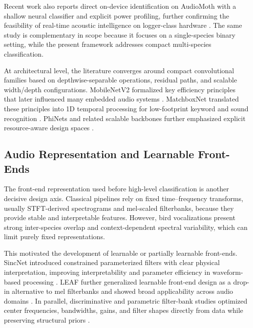 \documentclass[a4paper,singleside,12pt]{report} %
\begin{document}
	Recent work also reports direct on-device identification on AudioMoth with a shallow neural classifier and explicit power profiling, further confirming the feasibility of real-time acoustic intelligence on logger-class hardware \cite{velascomontero2026onsite}. The same study is complementary in scope because it focuses on a single-species binary setting, while the present framework addresses compact multi-species classification.

		\begin{sloppypar}
		At architectural level, the literature converges around compact convolutional families based on depthwise-separable operations, residual paths, and scalable width/depth configurations. MobileNetV2 formalized key efficiency principles that later influenced many embedded audio systems \cite{mobilenetv2}. MatchboxNet translated these principles into 1D temporal processing for low-footprint keyword and sound recognition \cite{matchboxnet2020}. PhiNets and related scalable backbones further emphasized explicit resource-aware design spaces \cite{phinets2022,paissan2022scalableaudio}.
		\end{sloppypar}

	\subsection{Audio Representation and Learnable Front-Ends}
	The front-end representation used before high-level classification is another decisive design axis. Classical pipelines rely on fixed time--frequency transforms, usually STFT-derived spectrograms and mel-scaled filterbanks, because they provide stable and interpretable features. However, bird vocalizations present strong inter-species overlap and context-dependent spectral variability, which can limit purely fixed representations.

		\begin{sloppypar}
		This motivated the development of learnable or partially learnable front-ends. SincNet introduced constrained parameterized filters with clear physical interpretation, improving interpretability and parameter efficiency in waveform-based processing \cite{ravanelli2019sincnet}. LEAF further generalized learnable front-end design as a drop-in alternative to mel filterbanks and showed broad applicability across audio domains \cite{zeghidour2021leaf}. In parallel, discriminative and parametric filter-bank studies optimized center frequencies, bandwidths, gains, and filter shapes directly from data while preserving structural priors \cite{zhangwu2019discriminative,caiko2023parametric,peictukuljac2022learnable}.
		\end{sloppypar}
\end{document}
